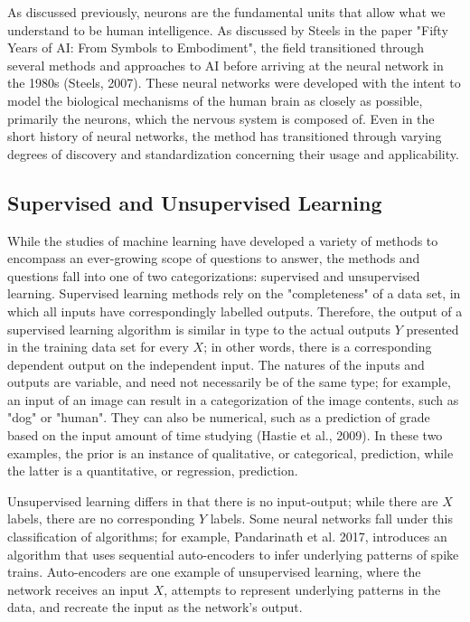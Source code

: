\documentclass[11pt]{article}
\begin{document}
As discussed previously, neurons are the fundamental units that allow what we understand to be human intelligence. As discussed by Steels in the paper "Fifty Years of AI: From Symbols to Embodiment", the field transitioned through several methods and approaches to AI before arriving at the neural network in the 1980s (Steels, 2007). These neural networks were developed with the intent to model the biological mechanisms of the human brain as closely as possible, primarily the neurons, which the nervous system is composed of. Even in the short history of neural networks, the method has transitioned through varying degrees of discovery and standardization concerning their usage and applicability.\par

\subsection{Supervised and Unsupervised Learning}
While the studies of machine learning have developed a variety of methods to encompass an ever-growing scope of questions to answer, the methods and questions fall into one of two categorizations: supervised and unsupervised learning. Supervised learning methods rely on the "completeness" of a data set, in which all inputs have correspondingly labelled outputs. Therefore, the output of a supervised learning algorithm is similar in type to the actual outputs $Y$ presented in the training data set for every $X$; in other words, there is a corresponding dependent output on the independent input. The natures of the inputs and outputs are variable, and need not necessarily be of the same type; for example, an input of an image can result in a categorization of the image contents, such as "dog" or "human". They can also be numerical, such as a prediction of grade based on the input amount of time studying (Hastie et al., 2009). In these two examples, the prior is an instance of qualitative, or categorical, prediction, while the latter is a quantitative, or regression, prediction.\par

Unsupervised learning differs in that there is no input-output; while there are $X$ labels, there are no corresponding $Y$ labels. Some neural networks fall under this classification of algorithms; for example, Pandarinath et al. 2017, introduces an algorithm that uses sequential auto-encoders to infer underlying patterns of spike trains. Auto-encoders are one example of unsupervised learning, where the network receives an input $X$, attempts to represent underlying patterns in the data, and recreate the input as the network's output. 
\end{document}
